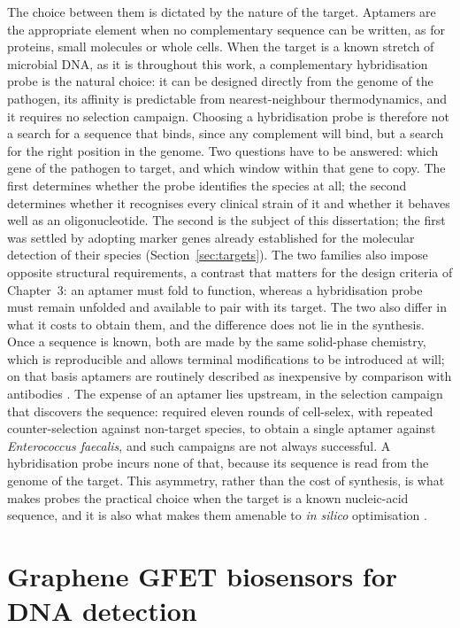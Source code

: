 The choice between them is dictated by the nature of the target. Aptamers are the appropriate element
when no complementary sequence can be written, as for proteins, small molecules or whole cells.
When the target is a known stretch of microbial DNA, as it is throughout this work, a
complementary hybridisation probe is the natural choice: it can be designed directly from the genome of
the pathogen, its affinity is predictable from nearest-neighbour thermodynamics, and it requires no
selection campaign. Choosing a hybridisation probe is therefore not a search for a sequence that binds, since any
complement will bind, but a search for the right position in the genome. Two questions have to be
answered: which gene of the pathogen to target, and which window within that gene to copy. The
first determines whether the probe identifies the species at all; the second determines whether it
recognises every clinical strain of it and whether it behaves well as an oligonucleotide. The
second is the subject of this dissertation; the first was settled by adopting marker genes already
established for the molecular detection of their species (Section~\ref{sec:targets}). The two
families also impose opposite structural requirements, a contrast that matters for the design criteria of
Chapter~3: an aptamer must fold to function, whereas a hybridisation probe must remain unfolded and
available to pair with its target. The two also differ in what it costs to obtain them, and the difference does not lie in the
synthesis. Once a sequence is known, both are made by the same solid-phase chemistry, which is
reproducible and allows terminal modifications to be introduced at will; on that basis aptamers
are routinely described as inexpensive by comparison with antibodies \citep{stephens2025}. The
expense of an aptamer lies upstream, in the selection campaign that discovers the sequence:
\citet{kolm2020} required eleven rounds of cell-\acrshort{selex}, with repeated counter-selection
against non-target species, to obtain a single aptamer against \emph{Enterococcus faecalis}, and
such campaigns are not always successful. A hybridisation probe incurs none of that, because its
sequence is read from the genome of the target. This asymmetry, rather than the cost of synthesis,
is what makes probes the practical choice when the target is a known nucleic-acid sequence, and it
is also what makes them amenable to \emph{in silico} optimisation \citep{sun2022}.

\section{Graphene GFET biosensors for DNA detection}

